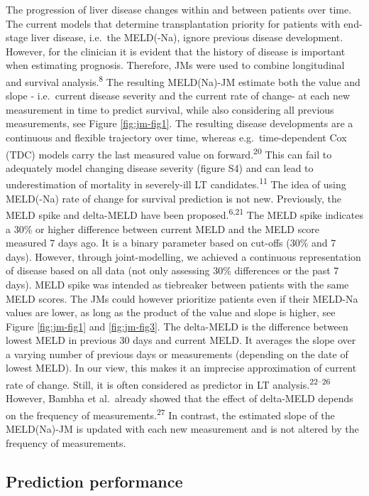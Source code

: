 \documentclass[11pt,english,]{book} %
\begin{document}
The progression of liver disease changes within and between patients over time. The current models that determine transplantation priority for patients with end-stage liver disease, i.e.~the MELD(-Na), ignore previous disease development. However, for the clinician it is evident that the history of disease is important when estimating prognosis. Therefore, JMs were used to combine longitudinal and survival analysis.\textsuperscript{8} The resulting MELD(Na)-JM estimate both the value and slope - i.e.~current disease severity and the current rate of change- at each new measurement in time to predict survival, while also considering all previous measurements, see Figure \ref{fig:jm-fig1}. The resulting disease developments are a continuous and flexible trajectory over time, whereas e.g.~time-dependent Cox (TDC) models carry the last measured value on forward.\textsuperscript{20} This can fail to adequately model changing disease severity (figure S4) and can lead to underestimation of mortality in severely-ill LT candidates.\textsuperscript{11} The idea of using MELD(-Na) rate of change for survival prediction is not new. Previously, the MELD spike and delta-MELD have been proposed.\textsuperscript{6,21} The MELD spike indicates a 30\% or higher difference between current MELD and the MELD score measured 7 days ago. It is a binary parameter based on cut-offs (30\% and 7 days). However, through joint-modelling, we achieved a continuous representation of disease based on all data (not only assessing 30\% differences or the past 7 days). MELD spike was intended as tiebreaker between patients with the same MELD scores. The JMs could however prioritize patients even if their MELD-Na values are lower, as long as the product of the value and slope is higher, see Figure \ref{fig:jm-fig1} and \ref{fig:jm-fig3}. The delta-MELD is the difference between lowest MELD in previous 30 days and current MELD. It averages the slope over a varying number of previous days or measurements (depending on the date of lowest MELD). In our view, this makes it an imprecise approximation of current rate of change. Still, it is often considered as predictor in LT analysis.\textsuperscript{22--26} However, Bambha et al.~already showed that the effect of delta-MELD depends on the frequency of measurements.\textsuperscript{27} In contrast, the estimated slope of the MELD(Na)-JM is updated with each new measurement and is not altered by the frequency of measurements.

\hypertarget{prediction-performance-1}{%
\subsection*{Prediction performance}\label{prediction-performance-1}}
\end{document}
